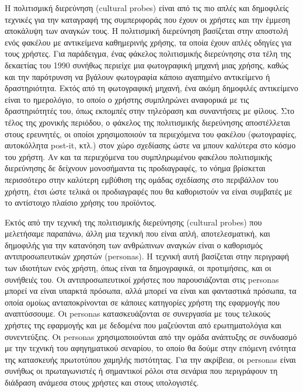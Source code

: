 \documentclass[
]{article}
\begin{document}
Η πολιτισμική διερεύνηση (cultural probes) είναι από τις πιο απλές και
δημοφιλείς τεχνικές για την καταγραφή της συμπεριφοράς που έχουν οι
χρήστες και την έμμεση αποκάλυψη των αναγκών τους. Η πολιτισμική
διερεύνηση βασίζεται στην αποστολή ενός φακέλου με αντικείμενα
καθημερινής χρήσης, τα οποία έχουν απλές οδηγίες για τους χρήστες. Για
παράδειγμα, ένας φάκελος πολιτισμικής διερεύνησης στα τέλη της δεκαετίας
του 1990 συνήθως περιείχε μια φωτογραφική μηχανή μιας χρήσης, καθώς και
την παρότρυνση να βγάλουν φωτογραφία κάποιο αγαπημένο αντικείμενο ή
δραστηριότητα. Εκτός από τη φωτογραφική μηχανή, ένα ακόμη δημοφιλές
αντικείμενο είναι το ημερολόγιο, το οποίο ο χρήστης συμπληρώνει
αναφορικά με τις δραστηριότητές του, όπως εκπομπές στην τηλεόραση και
συναντήσεις με φίλους. Στο τέλος της χρονικής περιόδου, ο φάκελος της
πολιτισμικής διερεύνησης αποστέλλεται στους ερευνητές, οι οποίοι
χρησιμοποιούν τα περιεχόμενα του φακέλου (φωτογραφίες, αυτοκόλλητα
post-it, κτλ.) στον χώρο σχεδίασης ώστε να μπουν καλύτερα στο κόσμο του
χρήστη. Αν και τα περιεχόμενα του συμπληρωμένου φακέλου πολιτισμικής
διερεύνησης δε δείχνουν μονοσήμαντα τις προδιαγραφές, το νόημα βρίσκεται
περισσότερο στην καλύτερη εμβύθιση της ομάδας σχεδίασης στο περιβάλλον
του χρήστη, έτσι ώστε τελικά οι προδιαγραφές που θα καθοριστούν να είναι
συμβατές με το αντίστοιχο πλαίσιο χρήσης του προϊόντος.

Εκτός από την τεχνική της πολιτισμικής διερεύνησης (cultural probes) που
μελετήσαμε παραπάνω, άλλη μια τεχνική που είναι απλή, αποτελεσματική,
και δημοφιλής για την κατανόηση των ανθρώπινων αναγκών είναι ο
καθορισμός αντιπροσωπευτικών χρηστών (personas). Η τεχνική αυτή
βασίζεται στην περιγραφή των ιδιοτήτων ενός χρήστη, όπως είναι τα
δημογραφικά, οι προτιμήσεις, και οι συνήθειές του. Οι αντιπροσωπευτικοί
χρήστες που παρουσιάζονται στις personas μπορεί να είναι υπαρκτά
πρόσωπα, αλλά μπορεί να είναι και φανταστικά πρόσωπα, τα οποία ομοίως
ανταποκρίνονται σε κάποιες κατηγορίες χρήστη της εφαρμογής που
αναπτύσσουμε. Οι personas κατασκευάζονται σε συνεργασία με τους τελικούς
χρήστες της εφαρμογής και με δεδομένα που μαζεύονται από ερωτηματολόγια
και συνεντεύξεις. Οι personas χρησιμοποιούνται από την ομάδα ανάπτυξης
σε συνδυασμό με την τεχνική του αφηγηματικού σεναρίου, το οποίο θα δούμε
στην επόμενη ενότητα της κατασκευής πρωτοτύπου χαμηλής πιστότητας. Για
την ακρίβεια, οι personas είναι συνήθως οι πρωταγωνιστές ή σημαντικοί
ρόλοι στα σενάρια που περιγράφουν τη διάδραση ανάμεσα στους χρήστες και
στους υπολογιστές.
\end{document}
